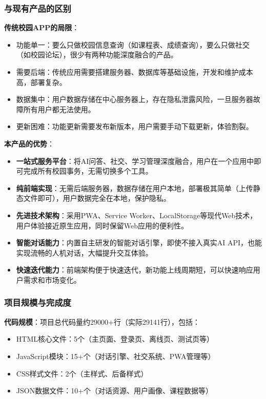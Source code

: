 \documentclass[12pt,a4paper]{article}
\begin{document}
\subsubsection{与现有产品的区别}

\textbf{传统校园APP的局限}：
\begin{itemize}
    \item 功能单一：要么只做校园信息查询（如课程表、成绩查询），要么只做社交（如校园论坛），很少有两种功能深度融合的产品。
    \item 需要后端：传统应用需要搭建服务器、数据库等基础设施，开发和维护成本高，部署复杂。
    \item 数据集中：用户数据存储在中心服务器上，存在隐私泄露风险，一旦服务器故障所有用户都无法使用。
    \item 更新困难：功能更新需要发布新版本，用户需要手动下载更新，体验割裂。
\end{itemize}

\textbf{本产品的优势}：
\begin{itemize}
    \item \textbf{一站式服务平台}：将AI问答、社交、学习管理深度融合，用户在一个应用中即可完成所有校园事务，无需切换多个工具。
    \item \textbf{纯前端实现}：无需后端服务器，数据存储在用户本地，部署极其简单（上传静态文件即可），用户数据完全在本地，保护隐私。
    \item \textbf{先进技术架构}：采用PWA、Service Worker、LocalStorage等现代Web技术，用户体验接近原生应用，同时保留Web应用的便利性。
    \item \textbf{智能对话能力}：内置自主研发的智能对话引擎，即使不接入真实AI API，也能实现流畅的人机对话，大幅提升交互体验。
    \item \textbf{快速迭代能力}：前端架构便于快速迭代，新功能上线周期短，可以快速响应用户需求和市场变化。
\end{itemize}

\subsubsection{项目规模与完成度}

\textbf{代码规模}：项目总代码量约29000+行（实际29141行），包括：
\begin{itemize}
    \item HTML核心文件：5个（主页面、登录页、离线页、测试页等）
    \item JavaScript模块：15+个（对话引擎、社交系统、PWA管理等）
    \item CSS样式文件：2个（主样式、后备样式）
    \item JSON数据文件：10+个（对话资源、用户画像、课程数据等）
\end{itemize}
\end{document}
